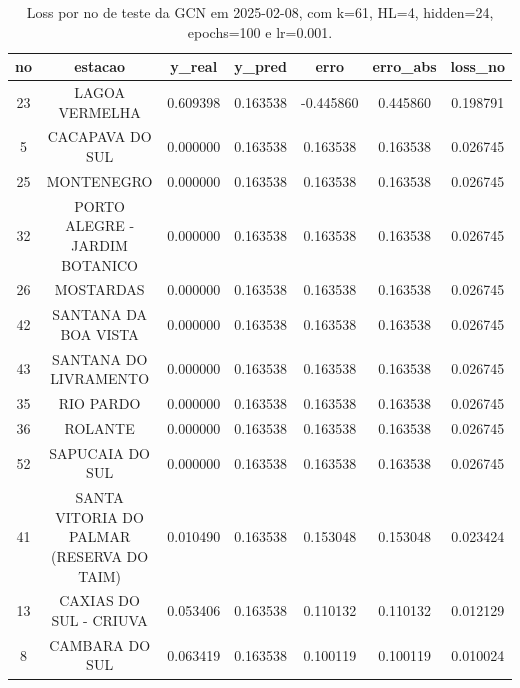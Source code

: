 \begin{table}[h]
\centering
\caption{Loss por no de teste da GCN em 2025-02-08, com k=61, HL=4, hidden=24, epochs=100 e lr=0.001.}
\label{tab:gcn_loss_k61_hl4_h24_e100_d20250208}
\begin{tabular}{ccccccc}
\toprule
no & estacao & y\_real & y\_pred & erro & erro\_abs & loss\_no \\
\midrule
23 & LAGOA VERMELHA & 0.609398 & 0.163538 & -0.445860 & 0.445860 & 0.198791 \\
5 & CACAPAVA DO SUL & 0.000000 & 0.163538 & 0.163538 & 0.163538 & 0.026745 \\
25 & MONTENEGRO & 0.000000 & 0.163538 & 0.163538 & 0.163538 & 0.026745 \\
32 & PORTO ALEGRE - JARDIM BOTANICO & 0.000000 & 0.163538 & 0.163538 & 0.163538 & 0.026745 \\
26 & MOSTARDAS & 0.000000 & 0.163538 & 0.163538 & 0.163538 & 0.026745 \\
42 & SANTANA DA BOA VISTA & 0.000000 & 0.163538 & 0.163538 & 0.163538 & 0.026745 \\
43 & SANTANA DO LIVRAMENTO & 0.000000 & 0.163538 & 0.163538 & 0.163538 & 0.026745 \\
35 & RIO PARDO & 0.000000 & 0.163538 & 0.163538 & 0.163538 & 0.026745 \\
36 & ROLANTE & 0.000000 & 0.163538 & 0.163538 & 0.163538 & 0.026745 \\
52 & SAPUCAIA DO SUL & 0.000000 & 0.163538 & 0.163538 & 0.163538 & 0.026745 \\
41 & SANTA VITORIA DO PALMAR (RESERVA DO TAIM) & 0.010490 & 0.163538 & 0.153048 & 0.153048 & 0.023424 \\
13 & CAXIAS DO SUL - CRIUVA & 0.053406 & 0.163538 & 0.110132 & 0.110132 & 0.012129 \\
8 & CAMBARA DO SUL & 0.063419 & 0.163538 & 0.100119 & 0.100119 & 0.010024 \\
\bottomrule
\end{tabular}
\end{table}
